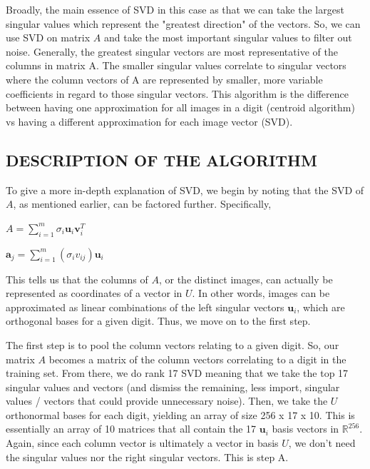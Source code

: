 \documentclass[dvipsnames,12pt]{article} %
\newcommand{\bs}[1]{\boldsymbol{#1}}
\begin{document}
        \vskip 06pt

        \hskip 12pt Broadly, the main essence of SVD in this case as that we can take the largest singular values which represent the "greatest direction" of the vectors. So, we can use SVD on matrix $A$ and take the most important singular values to filter out noise. Generally, the greatest singular vectors are most representative of the columns in matrix A. The smaller singular values correlate to singular vectors where the column vectors of A are represented by smaller, more variable coefficients in regard to those singular vectors. This algorithm is the difference between having one approximation for all images in a digit (centroid algorithm) vs having a different approximation for each image vector (SVD).

        \subsection{DESCRIPTION OF THE ALGORITHM}
          \label{SECT 04.01:SVD DESCRIPTION}

         \hskip 12pt To give a more in-depth explanation of SVD, we begin by noting that the SVD of $A$, as mentioned earlier, can be factored further. Specifically,

         \begin{center}
             $A = \sum^m_{i=1}\sigma_i\bs{u}_i\bs{v}_i^T$

             $\bs{a}_j = \sum^m_{i=1}(\sigma_iv_{ij})\bs{u}_i$
         \end{center}

        \hskip 12pt This tells us that the columns of $A$, or the distinct images, can actually be represented as coordinates of a vector in $U$. In other words, images can be approximated as linear combinations of the left singular vectors $\bs{u}_i$, which are orthogonal bases for a given digit. Thus, we move on to the first step.

        \vskip 06pt


        \hskip 12pt The first step is to pool the column vectors relating to a given digit. So, our matrix $A$ becomes a matrix of the column vectors correlating to a digit in the training set. From there, we do rank 17 SVD meaning that we take the top 17 singular values and vectors (and dismiss the remaining, less import, singular values / vectors that could provide unnecessary noise). Then, we take the $U$ orthonormal bases for each digit, yielding an array of size 256 x 17 x 10. This is essentially an array of 10 matrices that all contain the 17 $\bs{u}_i$ basis vectors in $\mathbb{R}^{256}$. Again, since each column vector is ultimately a vector in basis $U$, we don't need the singular values nor the right singular vectors. This is step A.
\end{document}
